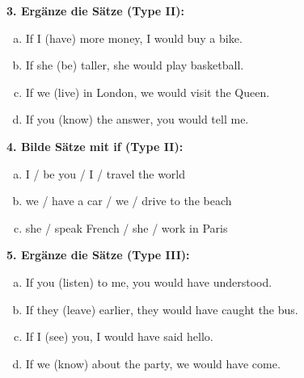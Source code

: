 \textbf{3. Ergänze die Sätze (Type II):}
\begin{enumerate}[a)]
    \item If I \underline{\hspace{2cm}} (have) more money, I would buy a bike.
    \item If she \underline{\hspace{2cm}} (be) taller, she would play basketball.
    \item If we \underline{\hspace{2cm}} (live) in London, we would visit the Queen.
    \item If you \underline{\hspace{2cm}} (know) the answer, you would tell me.
\end{enumerate}

\vspace{0.5em}

\textbf{4. Bilde Sätze mit if (Type II):}
\begin{enumerate}[a)]
    \item I / be you / I / travel the world
    \item we / have a car / we / drive to the beach
    \item she / speak French / she / work in Paris
\end{enumerate}

\vspace{0.5em}

\textbf{5. Ergänze die Sätze (Type III):}

\begin{enumerate}[a)]
    \item If you \underline{\hspace{2cm}} (listen) to me, you would have understood.
    \item If they \underline{\hspace{2cm}} (leave) earlier, they would have caught the bus.
    \item If I \underline{\hspace{2cm}} (see) you, I would have said hello.
    \item If we \underline{\hspace{2cm}} (know) about the party, we would have come.
\end{enumerate}


\vspace{0.5em}

